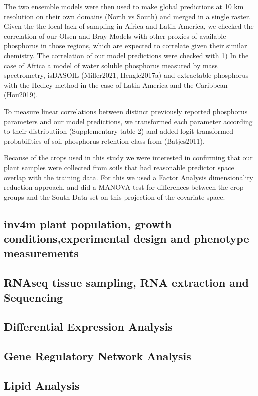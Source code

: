 The two ensemble models were then used to make global predictions at 10 km resolution on their own domains (North vs South) and merged in a single raster.
Given the the local lack of sampling in Africa and Latin America, we checked the correlation of our Olsen and Bray Models with other proxies of available phosphorus in those regions, which are expected to correlate given their similar chemistry. The correlation of  our model predictions were checked with 1) In the case of Africa a model of water soluble phosphorus measured by mass spectrometry, isDASOIL (Miller2021, Hengle2017a) and  extractable phosphorus with the Hedley method in the case of Latin America and the Caribbean (Hou2019). 

To measure linear correlations between distinct previously reported phosphorus parameters and our model predictions, we transformed  each parameter according to their distributiion (Supplementary table 2)  and  added logit transformed probabilities of  soil phosphorus retention class from (Batjes2011).

Because of the crops used in this study we were interested in confirming that our plant samples were collected from soils that had reasonable predictor space overlap with the training data. For this we used a Factor Analysis dimensionality reduction approach, and did a MANOVA test for differences between the crop groups and the South Data set on this projection of the covariate space.

\subsection*{inv4m plant population, growth conditions,experimental design and phenotype measurements}

\subsection*{RNAseq tissue sampling, RNA extraction and Sequencing}

\subsection*{Differential Expression Analysis}

\subsection*{Gene Regulatory Network Analysis}

\subsection*{Lipid Analysis}

